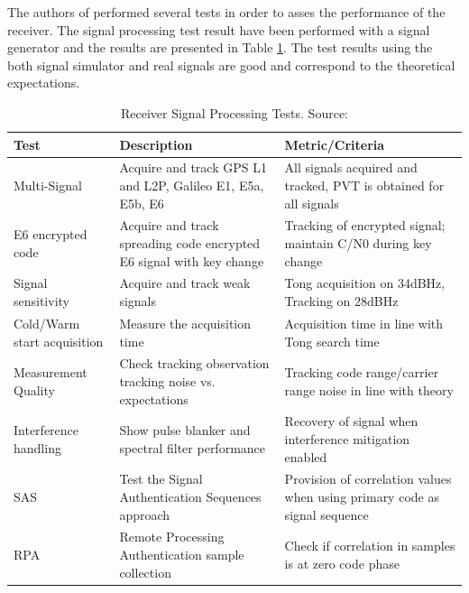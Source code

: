 The authors of \cite{e6breceiver} performed several tests in order to asses the performance of the receiver. The signal processing test result have been performed with a signal generator and the results are presented in Table \ref{table:3}. The test results using the both signal simulator and real signals are good and correspond to the theoretical expectations.

\begin{table}[h!]
\centering
\begin{tabular}{| m{12em} | m{12em} | m{12em}|}
    \hline
    Test & Description & Metric/Criteria \\
    \hline
    Multi-Signal  & Acquire and track GPS L1 and L2P, Galileo E1, E5a, E5b, E6 & All signals acquired and tracked, PVT is obtained for all signals \\
    \hline
    E6 encrypted code & Acquire and track spreading code encrypted E6 signal with key change & Tracking of encrypted signal; maintain C/N0 during key change \\
    \hline
    Signal sensitivity & Acquire and track weak signals & Tong acquisition on 34dBHz, Tracking on 28dBHz \\
    \hline
    Cold/Warm start acquisition & Measure the acquisition time & Acquisition time in line with Tong search time \\
    \hline
    Measurement Quality & Check tracking observation tracking noise vs. expectations & Tracking code range/carrier range noise in line with theory \\
    \hline
    Interference handling & Show pulse blanker and spectral filter performance & Recovery of signal when interference mitigation enabled \\
    \hline
    SAS & Test the Signal Authentication Sequences approach & Provision of correlation values when using primary code as signal sequence \\
    \hline
    RPA & Remote Processing Authentication sample collection & Check if correlation in samples is at zero code phase \\
    \hline
    
\end{tabular}
\caption{Receiver Signal Processing Tests. Source: \cite{e6breceiver}}
\label{table:3}
\end{table}